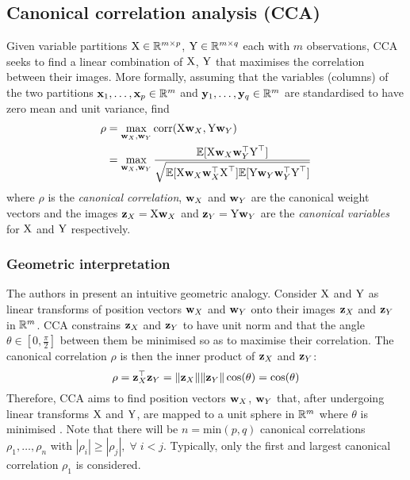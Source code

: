 \subsection{Canonical correlation analysis (CCA)}
\label{section:cca-c3}
Given variable partitions ${\textrm{X}} \in \mathbb{R}^{m\times p}$, ${\textrm{Y}} \in \mathbb{R}^{m\times q}$ each with $m$ observations, CCA seeks to find a linear combination of ${\textrm{X}}$, ${\textrm{Y}}$ that maximises the correlation between their images. More formally, assuming that the variables (columns) of the two partitions ${\mathbf{x}}_1, \dots, {\mathbf{x}}_p \in \mathbb{R}^{m}$ and ${\mathbf{y}}_1, \dots, {\mathbf{y}}_q \in \mathbb{R}^{m}$ are standardised to have zero mean and unit variance, find
\begin{align}
    \rho &= \max_{{\mathbf{w}}_X, {\mathbf{w}}_Y} \textrm{corr}({\textrm{X}} {\mathbf{w}}_X, {\textrm{Y}} {\mathbf{w}}_Y) \\
    &= \max_{{\mathbf{w}}_X, {\mathbf{w}}_Y} \frac{{\mathbb{E}}[{\textrm{X}} {\mathbf{w}}_X{\mathbf{w}}_Y^\top{\textrm{Y}}^\top ]}{\sqrt{{\mathbb{E}}[{\textrm{X}} {\mathbf{w}}_X{\mathbf{w}}_X^\top{\textrm{X}}^\top]{\mathbb{E}}[{\textrm{Y}} {\mathbf{w}}_Y{\mathbf{w}}_Y^\top{\textrm{Y}}^\top]}}
    \label{eq:cca-corr-objective}
\end{align}
where $\rho$ is the \textit{canonical correlation}, ${\mathbf{w}}_X$ and ${\mathbf{w}}_Y$ are the canonical weight vectors and the images ${\mathbf{z}}_X = {\textrm{X}}{\mathbf{w}}_X$ and ${\mathbf{z}}_Y = {\textrm{Y}}{\mathbf{w}}_Y$ are the \textit{canonical variables} for ${\textrm{X}}$ and ${\textrm{Y}}$ respectively.

\subsubsection{Geometric interpretation}
The authors in \cite{cca-tutorial} present an intuitive geometric analogy. Consider ${\textrm{X}}$ and ${\textrm{Y}}$ as linear transforms of position vectors ${\mathbf{w}}_X$ and ${\mathbf{w}}_Y$ onto their images ${\mathbf{z}}_X$ and ${\mathbf{z}}_Y$ in $\mathbb{R}^m$. CCA constrains ${\mathbf{z}}_X$ and ${\mathbf{z}}_Y$ to have unit norm and that the angle $\theta \in [0, \frac{\pi}{2}]$ between them be minimised so as to maximise their correlation. The canonical correlation $\rho$ is then the inner product of ${\mathbf{z}}_X$ and ${\mathbf{z}}_Y$:
\begin{equation}
    \rho = {\mathbf{z}}_X^\top{\mathbf{z}}_Y = \|{\mathbf{z}}_X\| \|{\mathbf{z}}_Y\|\cos(\theta) = \cos(\theta)
\end{equation}
Therefore, CCA aims to find position vectors ${\mathbf{w}}_X$, ${\mathbf{w}}_Y$ that, after undergoing linear transforms ${\textrm{X}}$ and ${\textrm{Y}}$, are mapped to a unit sphere in $\mathbb{R}^m$ where $\theta$ is minimised \cite{cca-tutorial}. Note that there will be $n=\textrm{min}(p, q)$ canonical correlations $\rho_1, \dots, \rho_n$ with $|\rho_i| \geq |\rho_j|, \; \forall \; i < j$. Typically, only the first and largest canonical correlation $\rho_1$ is considered. 

